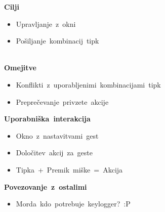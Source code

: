 \documentclass[10pt,landscape,a4paper,oneside]{article}
\newenvironment{items}{
\begin{itemize}
	\setlength{\itemsep}{2pt}
	\setlength{\parskip}{0pt}
	\setlength{\parsep}{0pt}
	\setlength{\topsep}{0pt}
}{\end{itemize}}
\begin{document}
\begin{center}
	\Huge\mbox{\bf Cilji}\\[1cm]
	\begin{items}
	\item \mbox{Upravljanje z okni}
	\item \mbox{Pošiljanje kombinacij tipk}
	\end{items}\ \\[2cm]
	\Huge\mbox{\bf Omejitve}\\[1cm]
	\begin{items}
	\item \mbox{Konflikti z uporabljenimi kombinacijami tipk}
	\item \mbox{Preprečevanje privzete akcije}
	\end{items}
\end{center}
\pagebreak
\begin{center}
	\Huge\mbox{\bf Uporabniška interakcija}\\[2cm]
	\begin{items}
	\item \mbox{Okno z nastavitvami gest}
	\item \mbox{Določitev akcij za geste}
	\item \mbox{Tipka + Premik miške = Akcija}
	\end{items}
\end{center}
\pagebreak
\begin{center}
	\Huge\mbox{\bf Povezovanje z ostalimi}\\[2cm]
	\begin{items}
	\item \mbox{Morda kdo potrebuje keylogger? :P}
	\end{items}
\end{center}
\end{document}
